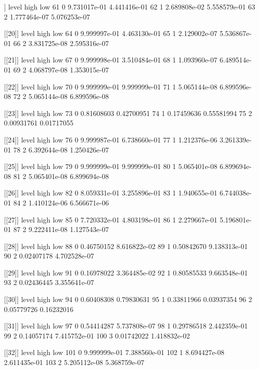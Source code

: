 \documentclass[letterpaper,10pt]{amsart}
\newenvironment{verbatimcode}{\bigskip \scriptsize \verbatim}{\endverbatim \normalsize \bigskip}
\begin{document}
\begin{enumerate}[(1)]
\begin{verbatimcode}
[[19]]
   level         high          low
61     0 9.731017e-01 4.441416e-01
62     1 2.689808e-02 5.558579e-01
63     2 1.777464e-07 5.076253e-07

[[20]]
   level         high          low
64     0 9.999997e-01 4.463130e-01
65     1 2.129002e-07 5.536867e-01
66     2 3.831725e-08 2.595316e-07

[[21]]
   level         high          low
67     0 9.999998e-01 3.510484e-01
68     1 1.093960e-07 6.489514e-01
69     2 4.068797e-08 1.353015e-07

[[22]]
   level         high          low
70     0 9.999999e-01 9.999999e-01
71     1 5.065144e-08 6.899596e-08
72     2 5.065144e-08 6.899596e-08

[[23]]
   level       high        low
73     0 0.81608603 0.42700951
74     1 0.17459636 0.55581994
75     2 0.00931761 0.01717055

[[24]]
   level         high          low
76     0 9.999987e-01 6.738660e-01
77     1 1.212376e-06 3.261339e-01
78     2 6.392644e-08 1.250426e-07

[[25]]
   level         high          low
79     0 9.999999e-01 9.999999e-01
80     1 5.065401e-08 6.899694e-08
81     2 5.065401e-08 6.899694e-08

[[26]]
   level         high          low
82     0 8.059331e-01 3.255896e-01
83     1 1.940655e-01 6.744038e-01
84     2 1.410124e-06 6.566671e-06

[[27]]
   level         high          low
85     0 7.720332e-01 4.803198e-01
86     1 2.279667e-01 5.196801e-01
87     2 9.222411e-08 1.127543e-07

[[28]]
   level       high          low
88     0 0.46750152 8.616822e-02
89     1 0.50842670 9.138313e-01
90     2 0.02407178 4.702528e-07

[[29]]
   level       high          low
91     0 0.16978022 3.364485e-02
92     1 0.80585533 9.663548e-01
93     2 0.02436445 3.355641e-07

[[30]]
   level       high        low
94     0 0.60408308 0.79830631
95     1 0.33811966 0.03937354
96     2 0.05779726 0.16232016

[[31]]
    level       high          low
97      0 0.54414287 5.737808e-07
98      1 0.29786518 2.442359e-01
99      2 0.14057174 7.415752e-01
100     3 0.01742022 1.418832e-02

[[32]]
    level         high          low
101     0 9.999999e-01 7.388560e-01
102     1 8.694427e-08 2.611435e-01
103     2 5.205112e-08 5.368759e-07


\end{verbatimcode}
\end{enumerate}
\end{document}
